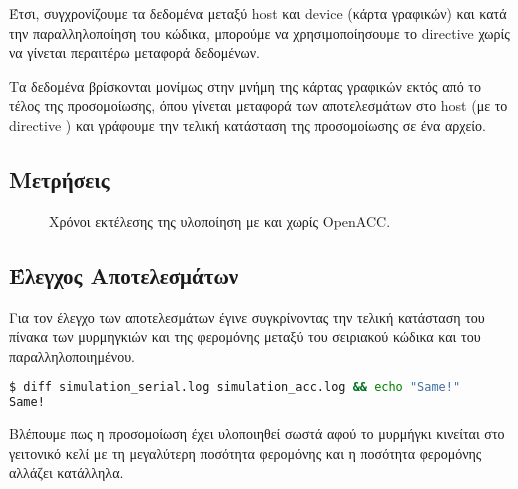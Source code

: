 \documentclass[11pt]{scrartcl} %
\begin{document}


Έτσι, συγχρονίζουμε τα δεδομένα μεταξύ host και device (κάρτα γραφικών) και κατά την παραλληλοποίηση του κώδικα, 
μπορούμε να χρησιμοποίησουμε το  directive χωρίς να γίνεται περαιτέρω μεταφορά δεδομένων. \cite{openaccbestpractices}

Τα δεδομένα βρίσκονται μονίμως στην μνήμη της κάρτας γραφικών εκτός από το
τέλος της προσομοίωσης, όπου γίνεται μεταφορά των αποτελεσμάτων στο host (με το
directive ) και γράφουμε την τελική κατάσταση της
προσομοίωσης σε ένα αρχείο.

\subsection{Μετρήσεις}


\begin{figure}[H]
    \begin{center}
    \end{center}
    \caption{Χρόνοι εκτέλεσης της υλοποίηση με και χωρίς OpenACC.}
    \label{fig:acc_times}
\end{figure}


\subsection{Έλεγχος Αποτελεσμάτων}

Για τον έλεγχο των αποτελεσμάτων έγινε συγκρίνοντας 
την τελική κατάσταση του πίνακα των μυρμηγκιών και της φερομόνης 
μεταξύ του σειριακού κώδικα και του παραλληλοποιημένου.

\begin{lstlisting}[language=Bash]
$ diff simulation_serial.log simulation_acc.log && echo "Same!"
Same!
\end{lstlisting}



Βλέπουμε πως η προσομοίωση έχει υλοποιηθεί σωστά αφού το μυρμήγκι κινείται στο γειτονικό κελί με τη μεγαλύτερη ποσότητα φερομόνης 
και η ποσότητα φερομόνης αλλάζει κατάλληλα.


\end{document}
